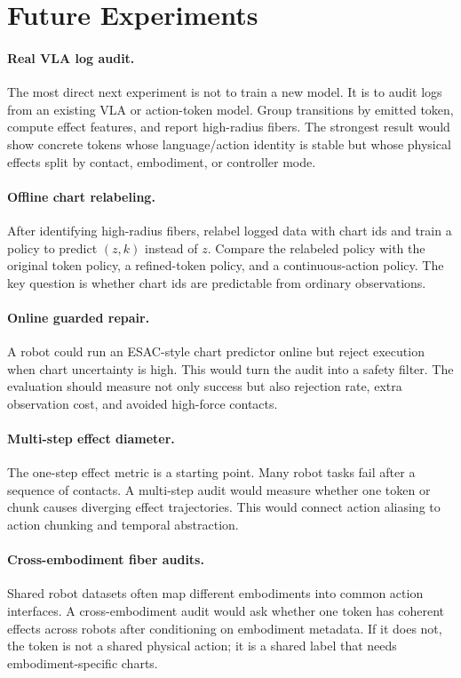 \documentclass{article}
\begin{document}
\section{Future Experiments}

\paragraph{Real VLA log audit.}
The most direct next experiment is not to train a new model. It is to audit
logs from an existing VLA or action-token model. Group transitions by emitted
token, compute effect features, and report high-radius fibers. The strongest
result would show concrete tokens whose language/action identity is stable but
whose physical effects split by contact, embodiment, or controller mode.

\paragraph{Offline chart relabeling.}
After identifying high-radius fibers, relabel logged data with chart ids and
train a policy to predict $(z,k)$ instead of $z$. Compare the relabeled policy
with the original token policy, a refined-token policy, and a continuous-action
policy. The key question is whether chart ids are predictable from ordinary
observations.

\paragraph{Online guarded repair.}
A robot could run an ESAC-style chart predictor online but reject execution when
chart uncertainty is high. This would turn the audit into a safety filter. The
evaluation should measure not only success but also rejection rate, extra
observation cost, and avoided high-force contacts.

\paragraph{Multi-step effect diameter.}
The one-step effect metric is a starting point. Many robot tasks fail after a
sequence of contacts. A multi-step audit would measure whether one token or
chunk causes diverging effect trajectories. This would connect action aliasing
to action chunking and temporal abstraction.

\paragraph{Cross-embodiment fiber audits.}
Shared robot datasets often map different embodiments into common action
interfaces. A cross-embodiment audit would ask whether one token has coherent
effects across robots after conditioning on embodiment metadata. If it does
not, the token is not a shared physical action; it is a shared label that needs
embodiment-specific charts.
\end{document}
